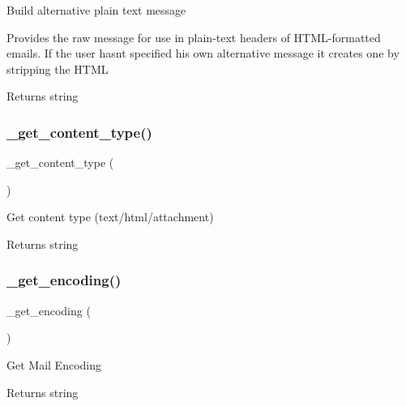 Build alternative plain text message

Provides the raw message for use in plain-\/text headers of H\+T\+M\+L-\/formatted emails. If the user hasn\textquotesingle{}t specified his own alternative message it creates one by stripping the H\+T\+ML

\begin{DoxyReturn}{Returns}
string 
\end{DoxyReturn}
\mbox{\label{class_c_i___email_a0df0801e489187b9f8108ec776f98f2e}} 
\subsubsection{\texorpdfstring{\+\_\+get\+\_\+content\+\_\+type()}{\_get\_content\_type()}}
{\footnotesize\ttfamily \+\_\+get\+\_\+content\+\_\+type (\begin{DoxyParamCaption}{ }\end{DoxyParamCaption})\hspace{0.3cm}{\ttfamily [protected]}}

Get content type (text/html/attachment)

\begin{DoxyReturn}{Returns}
string 
\end{DoxyReturn}
\mbox{\label{class_c_i___email_ab7a90b9198c0384a2a330728f2c78ebd}} 
\subsubsection{\texorpdfstring{\+\_\+get\+\_\+encoding()}{\_get\_encoding()}}
{\footnotesize\ttfamily \+\_\+get\+\_\+encoding (\begin{DoxyParamCaption}{ }\end{DoxyParamCaption})\hspace{0.3cm}{\ttfamily [protected]}}

Get Mail Encoding

\begin{DoxyReturn}{Returns}
string 
\end{DoxyReturn}
\mbox{\label{class_c_i___email_ad2d333b7bb9f6c25400714dd8931fe11}} 
